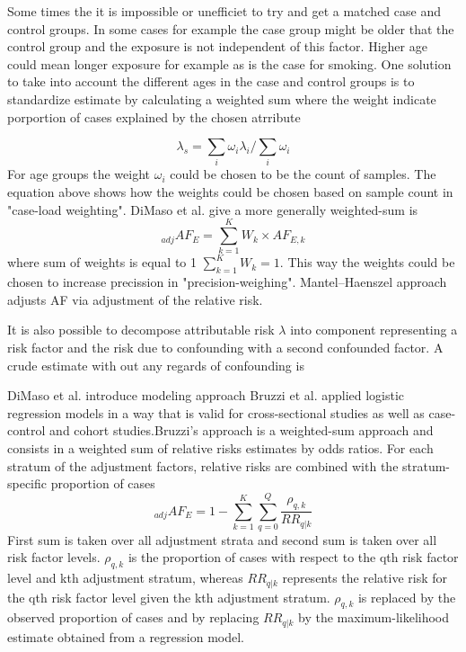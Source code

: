 Some times the it is impossible or unefficiet to try and get a matched case and control groups. In some cases for example the case group might be older that the control group and the exposure is not independent of this factor. Higher age could mean longer exposure for example as is the case for smoking. One solution to take into account the different ages in the case and control groups is to standardize estimate by calculating a weighted sum where the weight indicate porportion of cases explained by the chosen atrribute\cite{Walter1976TheEA}

\begin{equation}
    \lambda_s = \sum_{i}\omega_i\lambda_i/\sum_{i}\omega_i
\end{equation}
For age groups the weight $\omega_i$ could be chosen to be the count of samples.\cite{Walter1976TheEA} The equation above shows how the weights could be chosen based on sample count in "case-load weighting". DiMaso et al. give a more generally weighted-sum is 
\begin{equation}
    _{adj}AF_E=\sum_{k=1}^{K}W_k \times AF_{E,k}
\end{equation}where sum of weights is equal to 1 $\sum_{k=1}^{K}W_k = 1$. This way the weights could be chosen to increase precission in "precision-weighing". Mantel–Haenszel approach adjusts AF via adjustment of the relative risk.\cite{DiMaso2020AttributableFF} 

It is also possible to decompose attributable risk $\lambda$ into component representing a risk factor and the risk due to confounding with a second confounded factor. A crude estimate with out any regards of confounding is\cite{Walter1976TheEA}

DiMaso et al. introduce modeling approach Bruzzi et al. applied logistic regression models in a way that is valid for cross-sectional studies as well as case-control and cohort studies.Bruzzi's approach is a weighted-sum approach and consists in a weighted sum of relative risks estimates by odds ratios. For each stratum of the adjustment factors, relative risks are combined with the stratum-specific proportion of cases \cite{DiMaso2020AttributableFF} 
\begin{equation}
    _{adj}AF_E= 1 - \sum_{k=1}^{K}\sum_{q=0}^{Q}\frac{\rho_{q,k}}{RR_{q|k}}
\end{equation}\cite{DiMaso2020AttributableFF} First sum is taken over all adjustment strata and second sum is taken over all risk factor levels. $\rho_{q,k}$ is the proportion of cases with respect to the qth risk factor level and kth adjustment stratum, whereas $RR_{q|k}$ represents the relative risk for the qth risk factor level given the kth adjustment stratum. $\rho_{q,k}$ is replaced by the observed proportion of cases and by replacing $RR_{q|k}$ by the maximum-likelihood estimate obtained from a regression model.\cite{DiMaso2020AttributableFF}

